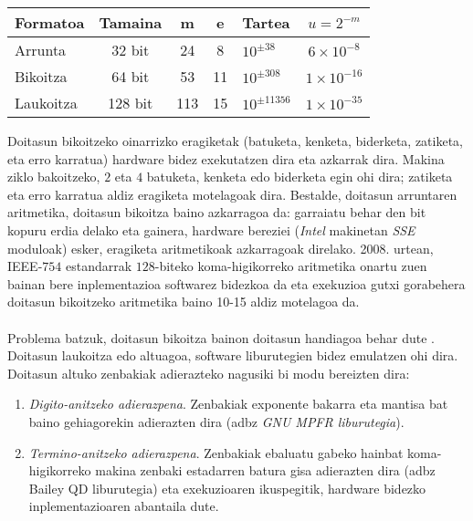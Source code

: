 \begin{table} [h!]
\caption{}
\label{tab:koma-higikorreko-aritmetikak}       %
\centering
\begin{tabular}{ l c c c l c} 
 \hline
 Formatoa      &  Tamaina    & m   & e  & Tartea           &  $u=2^{-m}$          \\
   \hline
 Arrunta   & 32 bit      & 24  & 8  & $10^{\pm 38}$    &  $6 \times 10^{-8}$   \\	    
 Bikoitza  & 64 bit      & 53  & 11 & $10^{\pm 308}$   &  $1 \times 10^{-16}$   \\
 Laukoitza & 128 bit     & 113 & 15 & $10^{\pm 11356}$ &  $1 \times 10^{-35}$   \\
\hline
\end{tabular}
\end{table}


Doitasun bikoitzeko oinarrizko eragiketak (batuketa, kenketa, biderketa, zatiketa, eta erro karratua) hardware bidez exekutatzen dira \cite{Muller2009} eta azkarrak dira. Makina ziklo bakoitzeko, $2$ eta $4$ batuketa, kenketa edo biderketa egin ohi dira; zatiketa eta erro karratua aldiz eragiketa motelagoak dira. Bestalde, doitasun arruntaren  aritmetika, doitasun bikoitza baino azkarragoa da: garraiatu behar den bit kopuru erdia delako eta gainera, hardware bereziei (\emph{Intel} makinetan \emph{SSE} moduloak) esker,  eragiketa aritmetikoak azkarragoak direlako. 2008. urtean, IEEE-$754$ estandarrak $128$-biteko koma-higikorreko aritmetika onartu zuen bainan bere inplementazioa  softwarez bidezkoa da eta exekuzioa gutxi gorabehera doitasun bikoitzeko aritmetika baino 10-15 aldiz motelagoa da.

\paragraph*{} Problema batzuk, doitasun bikoitza bainon doitasun handiagoa behar dute \cite{Joldes2016}. Doitasun laukoitza edo altuagoa, software liburutegien bidez emulatzen ohi dira. Doitasun altuko zenbakiak adierazteko nagusiki bi modu bereizten dira:   

\begin{enumerate}
\item \emph{Digito-anitzeko adierazpena}. Zenbakiak exponente bakarra eta mantisa bat baino gehiagorekin adierazten dira (adbz \emph{GNU MPFR liburutegia}).
\item \emph{Termino-anitzeko adierazpena}. Zenbakiak  ebaluatu gabeko hainbat koma-higikorreko makina zenbaki estadarren batura gisa adierazten dira (adbz Bailey QD liburutegia) eta exekuzioaren ikuspegitik, hardware bidezko inplementazioaren abantaila dute.    
\end{enumerate}

